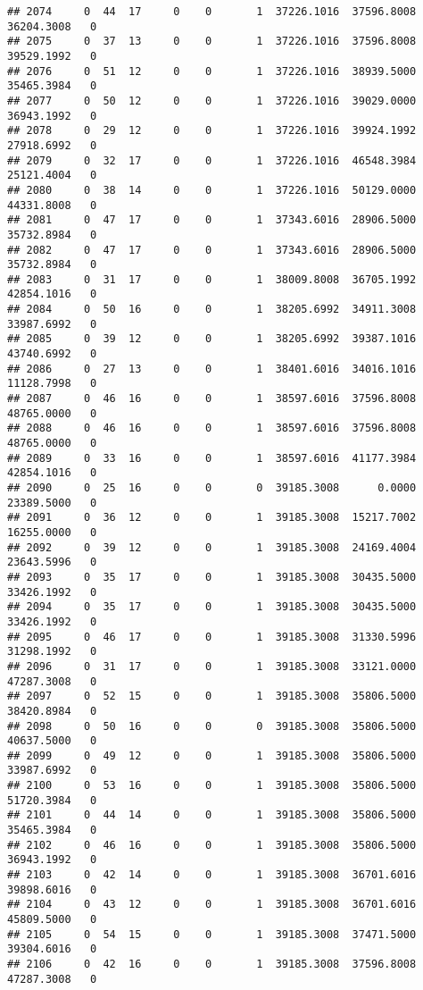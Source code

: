 \documentclass[
]{article}
\begin{document}
\begin{enumerate}
\begin{verbatim}
## 2074     0  44  17     0    0       1  37226.1016  37596.8008  36204.3008   0
## 2075     0  37  13     0    0       1  37226.1016  37596.8008  39529.1992   0
## 2076     0  51  12     0    0       1  37226.1016  38939.5000  35465.3984   0
## 2077     0  50  12     0    0       1  37226.1016  39029.0000  36943.1992   0
## 2078     0  29  12     0    0       1  37226.1016  39924.1992  27918.6992   0
## 2079     0  32  17     0    0       1  37226.1016  46548.3984  25121.4004   0
## 2080     0  38  14     0    0       1  37226.1016  50129.0000  44331.8008   0
## 2081     0  47  17     0    0       1  37343.6016  28906.5000  35732.8984   0
## 2082     0  47  17     0    0       1  37343.6016  28906.5000  35732.8984   0
## 2083     0  31  17     0    0       1  38009.8008  36705.1992  42854.1016   0
## 2084     0  50  16     0    0       1  38205.6992  34911.3008  33987.6992   0
## 2085     0  39  12     0    0       1  38205.6992  39387.1016  43740.6992   0
## 2086     0  27  13     0    0       1  38401.6016  34016.1016  11128.7998   0
## 2087     0  46  16     0    0       1  38597.6016  37596.8008  48765.0000   0
## 2088     0  46  16     0    0       1  38597.6016  37596.8008  48765.0000   0
## 2089     0  33  16     0    0       1  38597.6016  41177.3984  42854.1016   0
## 2090     0  25  16     0    0       0  39185.3008      0.0000  23389.5000   0
## 2091     0  36  12     0    0       1  39185.3008  15217.7002  16255.0000   0
## 2092     0  39  12     0    0       1  39185.3008  24169.4004  23643.5996   0
## 2093     0  35  17     0    0       1  39185.3008  30435.5000  33426.1992   0
## 2094     0  35  17     0    0       1  39185.3008  30435.5000  33426.1992   0
## 2095     0  46  17     0    0       1  39185.3008  31330.5996  31298.1992   0
## 2096     0  31  17     0    0       1  39185.3008  33121.0000  47287.3008   0
## 2097     0  52  15     0    0       1  39185.3008  35806.5000  38420.8984   0
## 2098     0  50  16     0    0       0  39185.3008  35806.5000  40637.5000   0
## 2099     0  49  12     0    0       1  39185.3008  35806.5000  33987.6992   0
## 2100     0  53  16     0    0       1  39185.3008  35806.5000  51720.3984   0
## 2101     0  44  14     0    0       1  39185.3008  35806.5000  35465.3984   0
## 2102     0  46  16     0    0       1  39185.3008  35806.5000  36943.1992   0
## 2103     0  42  14     0    0       1  39185.3008  36701.6016  39898.6016   0
## 2104     0  43  12     0    0       1  39185.3008  36701.6016  45809.5000   0
## 2105     0  54  15     0    0       1  39185.3008  37471.5000  39304.6016   0
## 2106     0  42  16     0    0       1  39185.3008  37596.8008  47287.3008   0

\end{verbatim}
\end{enumerate}
\end{document}
